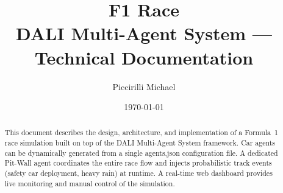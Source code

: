﻿\documentclass[12pt, a4paper]{article}
\title{%
  \vspace{-1.5cm}
  {\Large F1 Race}\\[0.4em]
  {\large DALI Multi-Agent System --- Technical Documentation}
}
\author{Piccirilli Michael}
\date{\today}
\begin{document}
\maketitle

\tableofcontents
\newpage

\begin{abstract}
This document describes the design, architecture, and implementation of a Formula~1 race simulation built on top of the DALI Multi-Agent System framework. Car agents can be dynamically generated from a single agents.json configuration file. A dedicated Pit-Wall agent coordinates the entire race flow and injects probabilistic track events (safety car deployment, heavy rain) at runtime. A real-time web dashboard provides live monitoring and manual control of the simulation.
\end{abstract}

\bigskip












\end{document}
